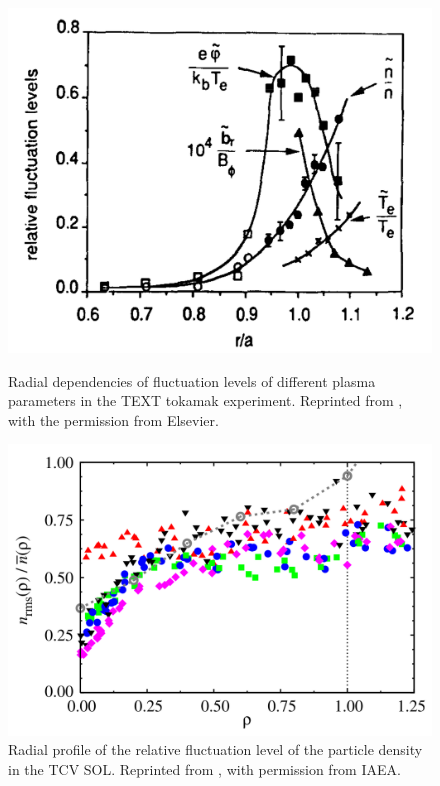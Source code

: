 \begin{figure}
	\centering
	\begin{minipage}{.48\linewidth}
		\includegraphics[width=\linewidth]{figures/wootton.png}
	\caption{Radial dependencies of fluctuation levels of different plasma parameters in the TEXT tokamak experiment. Reprinted from \cite{wootton1990edge}, with the permission from Elsevier.}
	\label{Fig:wootton}
	\end{minipage}
	\hfill
	\begin{minipage}{.48\linewidth}
		\includegraphics[width=\linewidth]{figures/garcia_rel_fluc.png}
	\caption{Radial profile of the relative fluctuation level of the particle density in the TCV SOL. Reprinted from \cite{garcia2007fluctuations}, with permission from IAEA.}
	\label{Fig:garcia_rel_fluc}
	\end{minipage}
\end{figure}

